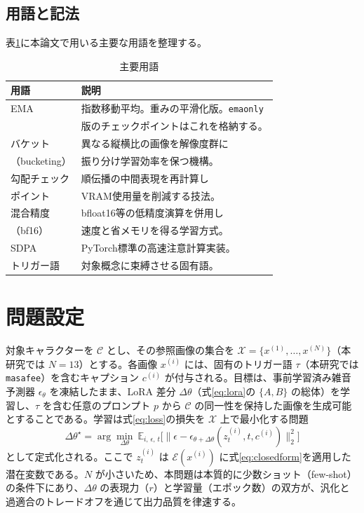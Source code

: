 \documentclass[10pt,twocolumn]{ltjsarticle}
\begin{document}
\subsection{用語と記法}
表\ref{tab:notation}に本論文で用いる主要な用語を整理する。

\begin{table}[t]\centering\small
\caption{主要用語}
\label{tab:notation}
\begin{tabular}{ll}
\toprule
用語 & 説明 \\
\midrule
EMA & 指数移動平均。重みの平滑化版。\texttt{emaonly} \\
    & 版のチェックポイントはこれを格納する。\\
バケット & 異なる縦横比の画像を解像度群に \\
（bucketing） & 振り分け学習効率を保つ機構。\\
勾配チェック & 順伝播の中間表現を再計算し \\
ポイント & VRAM使用量を削減する技法。\\
混合精度 & bfloat16等の低精度演算を併用し \\
（bf16） & 速度と省メモリを得る学習方式。\\
SDPA & PyTorch標準の高速注意計算実装。\\
トリガー語 & 対象概念に束縛させる固有語。\\
\bottomrule
\end{tabular}
\end{table}

\section{問題設定}
対象キャラクターを $\mathcal{C}$ とし、その参照画像の集合を $\mathcal{X}=\{x^{(1)},\dots,x^{(N)}\}$（本研究では $N=13$）とする。各画像 $x^{(i)}$ には、固有のトリガー語 $\tau$（本研究では \texttt{masafee}）を含むキャプション $c^{(i)}$ が付与される。目標は、事前学習済み雑音予測器 $\epsilon_\theta$ を凍結したまま、LoRA 差分 $\Delta\theta$（式\eqref{eq:lora}の $\{A,B\}$ の総体）を学習し、$\tau$ を含む任意のプロンプト $p$ から $\mathcal{C}$ の同一性を保持した画像を生成可能とすることである。学習は式\eqref{eq:loss}の損失を $\mathcal{X}$ 上で最小化する問題
\begin{equation}
\Delta\theta^{\star}=\arg\min_{\Delta\theta}\ \mathbb{E}_{i,\,\epsilon,\,t}\Big[\big\lVert\epsilon-\epsilon_{\theta+\Delta\theta}(z_t^{(i)},t,c^{(i)})\big\rVert_2^2\Big]
\end{equation}
として定式化される。ここで $z_t^{(i)}$ は $\mathcal{E}(x^{(i)})$ に式\eqref{eq:closedform}を適用した潜在変数である。$N$ が小さいため、本問題は本質的に少数ショット（few-shot）の条件下にあり、$\Delta\theta$ の表現力（$r$）と学習量（エポック数）の双方が、汎化と過適合のトレードオフを通じて出力品質を律速する。
\end{document}
